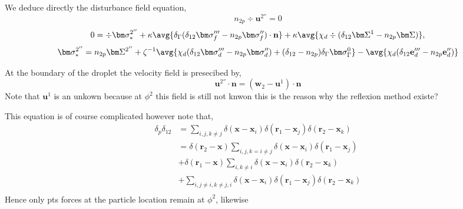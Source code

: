 We deduce directly the disturbance field equation, 
\begin{equation}
    n_{2p}\div \textbf{u}^{2''}=0
\end{equation}
\begin{equation*}
    0
    = 
    \div \bm\sigma_*^{2''}
    +\kappa\avg{\delta_\Gamma  (\delta_{12}\bm\sigma_f''' - n_{2p} \bm\sigma_f'')\cdot \textbf{n}}
    +\kappa \avg{\chi_d \div(\delta_{12} \bm\Sigma^1 - n_{2p} \bm\Sigma)},
 \end{equation*}
 \begin{equation}
     \bm\sigma_*^{2''} = 
     n_{2p} \bm\Sigma^{2''}
     + \zeta^{-1}\avg{\chi_d (\delta_{12}\bm\sigma_d''' - n_{2p} \bm\sigma_d'') + (\delta_{12}-n_{2p})\delta_\Gamma \bm\sigma_\Gamma^0}
     - \avg{\chi_d (\delta_{12} \textbf{e}_d'''- n_{2p} \textbf{e}_d'')}
 \end{equation}

 At the boundary of the droplet the velocity field is presecibed by,
\begin{equation}
   \textbf{u}^{2''} \cdot \textbf{n} 
   = (\textbf{w}_2 - \textbf{u}^1) \cdot \textbf{n}
\end{equation}
Note that $\textbf{u}^1$ is an unkown because at $\phi^2$ this field is still not knwon this  is the reason why the reflexion method existe?  

This equation is of course complicated however note that,
\begin{align*}
    \delta_p \delta_{12}
    &=
    \sum_{i,j,k\neq j} 
    \delta(\textbf{x}- \textbf{x}_i)
    \delta(\textbf{r}_1- \textbf{x}_j)
    \delta(\textbf{r}_2- \textbf{x}_k)\\
    &=
    \delta(\textbf{r}_2- \textbf{x})
    \sum_{i,j,k=i\neq j} 
    \delta(\textbf{x}- \textbf{x}_i)
    \delta(\textbf{r}_1- \textbf{x}_j)\\
    &+\delta(\textbf{r}_1- \textbf{x})
    \sum_{i,k\neq i} 
    \delta(\textbf{x}- \textbf{x}_i)
    \delta(\textbf{r}_2- \textbf{x}_k)\\
    &+\sum_{i,j\neq i,k\neq j,i} 
    \delta(\textbf{x}- \textbf{x}_i)
    \delta(\textbf{r}_1- \textbf{x}_j)
    \delta(\textbf{r}_2- \textbf{x}_k)\\
\end{align*}
Hence only pts forces at the particle location remain at $\phi^2$, likewise  



